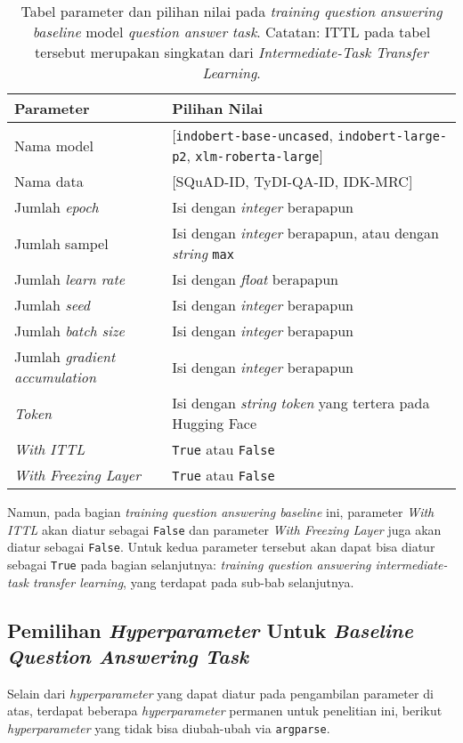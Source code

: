 \begin{table}[h!]
\centering
\begin{tabularx}{\linewidth}{lX}
 \toprule
 Parameter & Pilihan Nilai \\
 \midrule
 Nama model & [\texttt{indobert-base-uncased}, \texttt{indobert-large-p2}, \texttt{xlm-roberta-large}] \\  
 Nama data & [SQuAD-ID, TyDI-QA-ID, IDK-MRC] \\
 Jumlah \emph{epoch} & Isi dengan \emph{integer} berapapun \\
 Jumlah sampel & Isi dengan \emph{integer} berapapun, atau dengan \emph{string} \texttt{max} \\
 Jumlah \emph{learn rate} & Isi dengan \emph{float} berapapun \\ 
 Jumlah \emph{seed} & Isi dengan \emph{integer} berapapun \\ 
 Jumlah \emph{batch size} & Isi dengan \emph{integer} berapapun \\ 
 Jumlah \emph{gradient accumulation} & Isi dengan \emph{integer} berapapun \\ 
 \emph{Token} & Isi dengan \emph{string} \emph{token} yang tertera pada Hugging Face \\
 \emph{With ITTL} & \texttt{True} atau \texttt{False} \\
 \emph{With Freezing Layer} & \texttt{True} atau \texttt{False} \\
 \bottomrule
\end{tabularx}
\caption{Tabel parameter dan pilihan nilai pada \emph{training question answering} \emph{baseline} model \emph{question answer task}. Catatan: ITTL pada tabel tersebut merupakan singkatan dari \emph{Intermediate-Task Transfer Learning}.}
\end{table}

Namun, pada bagian \emph{training question answering baseline} ini, parameter \emph{With ITTL} akan diatur sebagai \texttt{False} dan parameter \emph{With Freezing Layer} juga akan diatur sebagai \texttt{False}. Untuk kedua parameter tersebut akan dapat bisa diatur sebagai \texttt{True} pada bagian selanjutnya: \emph{training question answering intermediate-task transfer learning}, yang terdapat pada sub-bab selanjutnya.

\subsection{Pemilihan \emph{Hyperparameter} Untuk \emph{Baseline Question Answering Task}}
\label{4.2.2}
Selain dari \emph{hyperparameter} yang dapat diatur pada pengambilan parameter di atas, terdapat beberapa \emph{hyperparameter} permanen untuk penelitian ini, berikut \emph{hyperparameter} yang tidak bisa diubah-ubah via \texttt{argparse}.

